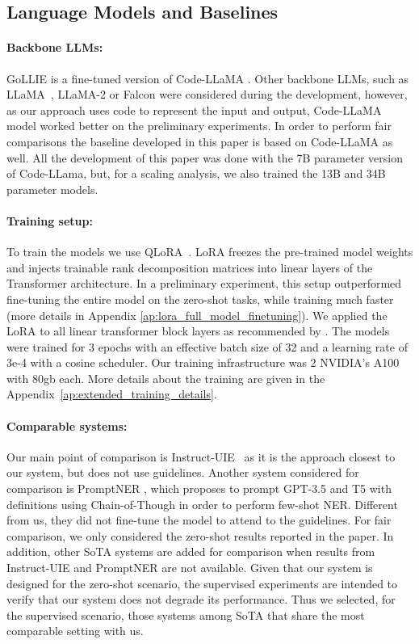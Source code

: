 \subsection{Language Models and Baselines}

\paragraph{Backbone LLMs:} \GoLLIE GoLLIE is a fine-tuned version of Code-LLaMA \cite{DBLP:journals/corr/abs-2308-12950}. Other backbone LLMs, such as LLaMA~\citep{DBLP:journals/corr/abs-2302-13971}, LLaMA-2 \cite{DBLP:journals/corr/abs-2307-09288} or Falcon \cite{DBLP:journals/corr/abs-2306-01116} were considered during the development, however, as our approach uses code to represent the input and output, Code-LLaMA model worked better on the preliminary experiments. In order to perform fair comparisons the baseline developed in this paper is based on Code-LLaMA as well. All the development of this paper was done with the 7B parameter version of Code-LLama, but, for a scaling analysis, we also trained the 13B and 34B parameter models.

\paragraph{Training setup:} To train the models we use QLoRA~\citep{lora, qlora}. LoRA freezes the pre-trained model weights and injects trainable rank decomposition matrices into linear layers of the Transformer architecture. In a preliminary experiment, this setup outperformed fine-tuning the entire model on the zero-shot tasks, while training much faster (more details in Appendix \ref{ap:lora_full_model_finetuning}). We applied the LoRA to all linear transformer block layers as recommended by \cite{qlora}. The models were trained for 3 epochs with an effective batch size of 32 and a learning rate of 3e-4 with a cosine scheduler. Our training infrastructure was 2 NVIDIA's A100 with 80gb each. More details about the training are given in the Appendix~\ref{ap:extended_training_details}.

\paragraph{Comparable systems:} Our main point of comparison is Instruct-UIE~\citep{DBLP:journals/corr/abs-2304-08085} as it is the approach closest to our system, but does not use guidelines. Another system considered for comparison is PromptNER \citep{DBLP:journals/corr/abs-2305-12217}, which proposes to prompt GPT-3.5 and T5 with definitions using Chain-of-Though in order to perform few-shot NER. Different from us, they did not fine-tune the model to attend to the guidelines. For fair comparison, we only considered the zero-shot results reported in the paper. In addition, other SoTA systems are added for comparison when results from Instruct-UIE and PromptNER are not available. Given that our system is designed for the zero-shot scenario, the supervised experiments are intended to verify that our system does not degrade its performance. Thus we selected, for the supervised scenario, those systems among SoTA that share the most comparable setting with us. 

